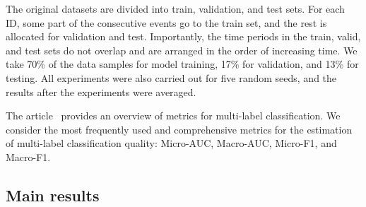 \documentclass[runningheads]{llncs}
\begin{document}
The original datasets are divided into train, validation, and test sets. For each ID, some part of the consecutive events go to the train set, and the rest is allocated for validation and test. 
Importantly, the time periods in the train, valid, and test sets do not overlap and 
are arranged in the order of increasing time. 
We take 70\% of the data samples for model training, 17\% for validation, and 13\% for testing. 
All experiments were also carried out for five random seeds, and the results after the experiments were averaged.


The article~\cite{wu2017unified} provides an overview of metrics for multi-label classification. We consider the most frequently used and comprehensive metrics for the estimation of multi-label classification quality: Micro-AUC, Macro-AUC, Micro-F1, and Macro-F1.

 

\subsection{Main results} 
\label{sec:comp_qual}
 
\end{document}
